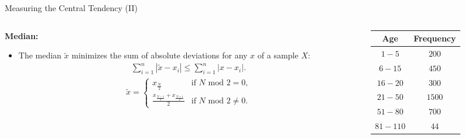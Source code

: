 \begin{frame}{Measuring the Central Tendency (II)}
	\begin{columns}
		\begin{column}{0.6\textwidth}
			\textbf{Median:}
			\begin{itemize}[noitemsep]
				\item The median $\tilde{x}$ minimizes the sum of absolute deviations for any $x$ of a sample $X$:
				      \begin{align}
					      \sum_{i=1}^{n} |\tilde{x}-x_i| \leq \sum_{i=1}^{n} |x-x_i|.
				      \end{align}
				      \begin{align}
					      \tilde{x} = \begin{cases}
						                  x_{\frac{N}{2}}                               & \text{if $N$ mod $2 = 0$,}    \\
						                  \frac{x_{\frac{N-1}{2}}+x_{\frac{N+1}{2}}}{2} & \text{if $N$ mod $2 \neq 0$.}
					                  \end{cases}
				      \end{align}
			\end{itemize}
		\end{column}
		\begin{column}{0.3\textwidth}  %
			\begin{table}
				\begin{tabular}{|c|c|}
					Age      & Frequency \\ \hline
					$1-5$    & $200$     \\
					$6-15$   & $450$     \\
					$16-20$  & $300$     \\
					$21-50$  & $1500$    \\
					$51-80$  & $700$     \\
					$81-110$ & $44$
				\end{tabular}\\[0.5cm]
			\end{table}
		\end{column}
	\end{columns}
\end{frame}

